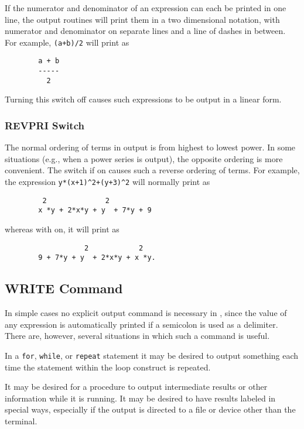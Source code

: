 If the numerator and denominator of an expression can each be printed in
one line, the output routines will print them in a two dimensional
notation, with numerator and denominator on separate lines and a line of
dashes in between. For example, \texttt{(a+b)/2} will print as
\begin{verbatim}
        a + b
        -----
          2
\end{verbatim}
Turning this switch off causes such expressions to be output in a linear
form.

\subsubsection{REVPRI Switch}
\hypertarget{switch:REVPRI}{}

The normal ordering of terms in output is from highest to lowest power.
In some situations (e.g., when a power series is output), the opposite
ordering is more convenient.  The switch  if on causes such a
reverse ordering of terms.  For example, the expression
\texttt{y*(x+1)\textasciicircum2+(y+3)\textasciicircum2} will normally print as
\begin{verbatim}
         2              2
        x *y + 2*x*y + y  + 7*y + 9
\end{verbatim}
whereas with  on, it will print as
\begin{verbatim}
                   2            2
        9 + 7*y + y  + 2*x*y + x *y.
\end{verbatim}

\hypertarget{command:WRITE}{\subsection{WRITE Command}}

In simple cases no explicit output command is necessary in
{\REDUCE}, since the value of any expression is automatically printed if a
semicolon is used as a delimiter.  There are, however, several situations
in which such a command is useful.

In a \texttt{for}, \texttt{while}, or \texttt{repeat} statement it may be desired
to output something each time the statement within the loop construct is
repeated.

It may be desired for a procedure to output intermediate results or other
information while it is running. It may be desired to have results labeled
in special ways, especially if the output is directed to a file or device
other than the terminal.

